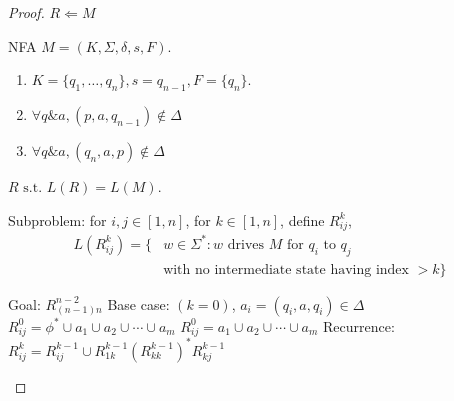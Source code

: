 \begin{proof}$R\Longleftarrow M$

    NFA $M=(K, \Sigma, \delta, s, F)$. 
    \begin{enumerate}
        \item $K=\{ q_1, \dots, q_n \}, s=q_{n-1}, F=\{ q_n \}$. 
        \item $\forall q \& a, (p, a, q_{n-1}) \notin  \Delta$
        \item $\forall q \& a, (q_n, a, p) \notin \Delta$
    \end{enumerate}

    $R \text{ s.t. } L(R)=L(M)$. 

    Subproblem: for $i,j \in [1,n]$, for $k\in [1,n]$, define $R_{ij}^k$, 
    \begin{align*}
        L(R_{ij}^k)=\{ &w\in \Sigma^*: w\text{ drives $M$ for $q_i$ to $q_j$ } \\
        &\text{with no intermediate state having index $>k$} \}
    \end{align*}
    \begin{algorithm}[H]%
        \begin{algorithmic}
            \State Goal: $R_{(n-1)n}^{n-2}$
            \State Base case: $(k=0)$, $a_i=(q_i, a, q_i)\in \Delta$%
                    \State $R_{ij}^0=\phi^* \cup a_1 \cup a_2 \cup \cdots \cup a_m$
                \EndIf
                    \State $R_{ij}^0=a_1\cup a_2 \cup \cdots \cup a_m$
                \EndIf
            \EndFor
            \State Recurrence: $R_{ij}^k=R_{ij}^{k-1}\cup R_{1k}^{k-1}\left( R_{kk}^{k-1} \right)^* R_{kj}^{k-1}$
        \end{algorithmic}
    \end{algorithm}
    
\end{proof}

